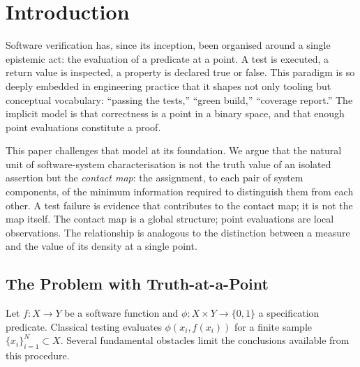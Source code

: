 \documentclass[12pt,a4paper,twocolumn]{article}
\theoremstyle{plain}
\theoremstyle{definition}
\theoremstyle{remark}
\begin{document}
\tableofcontents

\onecolumn   %

\section{Introduction}

Software verification has, since its inception, been organised around a
single epistemic act: the evaluation of a predicate at a point.  A test is
executed, a return value is inspected, a property is declared true or false.
This paradigm is so deeply embedded in engineering practice that it shapes not
only tooling but conceptual vocabulary: ``passing the tests,'' ``green build,''
``coverage report.''  The implicit model is that correctness is a point in a
binary space, and that enough point evaluations constitute a proof.

This paper challenges that model at its foundation.  We argue that the
natural unit of software-system characterisation is not the truth value of an
isolated assertion but the \emph{contact map}: the assignment, to each pair of
system components, of the minimum information required to distinguish them from
each other.  A test failure is evidence that contributes to the contact map;
it is not the map itself.  The contact map is a global structure; point
evaluations are local observations.  The relationship is analogous to the
distinction between a measure and the value of its density at a single point.

\subsection{The Problem with Truth-at-a-Point}

Let $f : X \to Y$ be a software function and $\phi : X \times Y \to
\{0,1\}$ a specification predicate.  Classical testing evaluates $\phi(x_i,
f(x_i))$ for a finite sample $\{x_i\}_{i=1}^N \subset X$.  Several
fundamental obstacles limit the conclusions available from this procedure.
\end{document}
